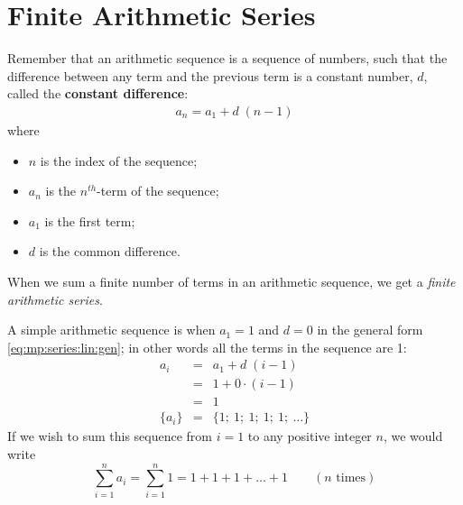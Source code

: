 
\section{Finite Arithmetic Series}

Remember that an arithmetic sequence is a sequence of numbers, such that the difference between any term and the previous term is a constant number, $d$, called the \textbf{constant difference}:
\begin{eqnarray}
\label{eq:mp:series:lin:gen}
a_n = a_1 + d \; (n - 1)
\end{eqnarray}
where
\begin{itemize}
\item $n$ is the index of the sequence;
\item $a_n$ is the $n^{th}$-term of the sequence;
\item $a_1$ is the first term;
\item $d$ is the common difference.
\end{itemize}

When we sum a finite number of terms in an arithmetic sequence, we get a \textit{finite arithmetic series}.

A simple arithmetic sequence is when $a_1=1$ and $d=0$ in the general form \eqref{eq:mp:series:lin:gen}; in other words all the terms in the sequence are 1:
\begin{eqnarray*}
a_i &=& a_1 + d \; (i - 1) \\
&=& 1 + 0 \cdot (i - 1) \\
&=& 1 \\
\{a_i\} &=& \{1; \: 1; \: 1; \: 1; \: 1; \: \ldots \}
\end{eqnarray*}
If we wish to sum this sequence from $i=1$ to any positive integer $n$, we would write
\begin{equation*}
\sum_{i=1}^n {a_i} = \sum_{i=1}^n 1 = 1 + 1 + 1 + \ldots + 1 \qquad (n\textrm{ times})
\end{equation*}


